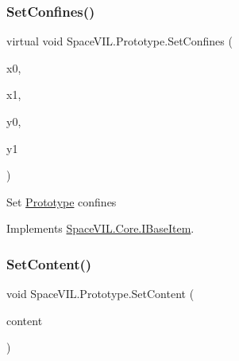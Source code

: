 \mbox{\label{class_space_v_i_l_1_1_prototype_ac409209f9adab44b149b5dff41bb2b00}} 
\subsubsection{\texorpdfstring{Set\+Confines()}{SetConfines()}\hspace{0.1cm}{\footnotesize\ttfamily [2/2]}}
{\footnotesize\ttfamily virtual void Space\+V\+I\+L.\+Prototype.\+Set\+Confines (\begin{DoxyParamCaption}\item[{int}]{x0,  }\item[{int}]{x1,  }\item[{int}]{y0,  }\item[{int}]{y1 }\end{DoxyParamCaption})\hspace{0.3cm}{\ttfamily [virtual]}}



Set \mbox{\hyperlink{class_space_v_i_l_1_1_prototype}{Prototype}} confines 



Implements \mbox{\hyperlink{interface_space_v_i_l_1_1_core_1_1_i_base_item}{Space\+V\+I\+L.\+Core.\+I\+Base\+Item}}.

\mbox{\label{class_space_v_i_l_1_1_prototype_aae3089e9f3585ccbf1b5a935cf0c0b27}} 
\subsubsection{\texorpdfstring{Set\+Content()}{SetContent()}}
{\footnotesize\ttfamily void Space\+V\+I\+L.\+Prototype.\+Set\+Content (\begin{DoxyParamCaption}\item[{List$<$ \mbox{\hyperlink{interface_space_v_i_l_1_1_core_1_1_i_base_item}{I\+Base\+Item}} $>$}]{content }\end{DoxyParamCaption})}



